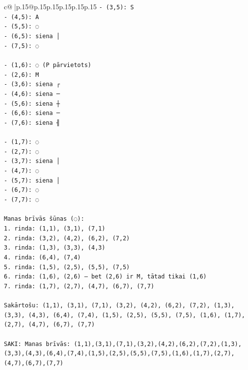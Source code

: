 \documentclass{article}
\begin{document}
{\begin{supertabular}{c@{$\;$}|p{.15\linewidth}@{}p{.15\linewidth}p{.15\linewidth}p{.15\linewidth}p{.15\linewidth}p{.15\linewidth}}
{{{\texttt{{-} (3,5): S} \\
\texttt{{-} (4,5): A} \\
\texttt{{-} (5,5): ◌} \\
\texttt{{-} (6,5): siena │} \\
\texttt{{-} (7,5): ◌} \\
\\ 
\texttt{{-} (1,6): ◌ (P pārvietots)} \\
\texttt{{-} (2,6): M} \\
\texttt{{-} (3,6): siena ┌} \\
\texttt{{-} (4,6): siena ─} \\
\texttt{{-} (5,6): siena ┼} \\
\texttt{{-} (6,6): siena ─} \\
\texttt{{-} (7,6): siena ╢} \\
\\ 
\texttt{{-} (1,7): ◌} \\
\texttt{{-} (2,7): ◌} \\
\texttt{{-} (3,7): siena │} \\
\texttt{{-} (4,7): ◌} \\
\texttt{{-} (5,7): siena │} \\
\texttt{{-} (6,7): ◌} \\
\texttt{{-} (7,7): ◌} \\
\\ 
\texttt{Manas brīvās šūnas (◌):} \\
\texttt{1. rinda: (1,1), (3,1), (7,1)} \\
\texttt{2. rinda: (3,2), (4,2), (6,2), (7,2)} \\
\texttt{3. rinda: (1,3), (3,3), (4,3)} \\
\texttt{4. rinda: (6,4), (7,4)} \\
\texttt{5. rinda: (1,5), (2,5), (5,5), (7,5)} \\
\texttt{6. rinda: (1,6), (2,6) — bet (2,6) ir M, tātad tikai (1,6)} \\
\texttt{7. rinda: (1,7), (2,7), (4,7), (6,7), (7,7)} \\
\\ 
\texttt{Sakārtošu: (1,1), (3,1), (7,1), (3,2), (4,2), (6,2), (7,2), (1,3), (3,3), (4,3), (6,4), (7,4), (1,5), (2,5), (5,5), (7,5), (1,6), (1,7), (2,7), (4,7), (6,7), (7,7)} \\
\\ 
\texttt{SAKI: Manas brīvās: (1,1),(3,1),(7,1),(3,2),(4,2),(6,2),(7,2),(1,3),(3,3),(4,3),(6,4),(7,4),(1,5),(2,5),(5,5),(7,5),(1,6),(1,7),(2,7),(4,7),(6,7),(7,7)} \\
            }
        }
    }
     \\ \\


\end{supertabular}}
\end{document}
